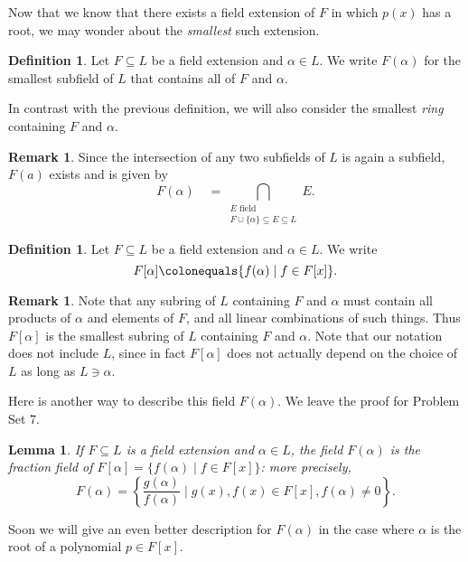 \documentclass[12pt]{report}
\newtheorem{lemma}[theorem]{Lemma}
\numberwithin{equation}{section}
\numberwithin{theorem}{chapter}
\theoremstyle{definition}
\newtheorem{definition}[theorem]{Definition}
\newtheorem*{basic properties}{Basic Properties}
\newtheorem*{Important Remark}{Important Remark}
\newtheorem{remark}[theorem]{Remark}
\begin{document}
Now that we know that there exists a field extension of $F$ in which $p(x)$ has a root, we may wonder about the {\em smallest} such extension.

\begin{definition}
Let $F \subseteq L$ be a field extension and $\alpha \in L$. We write $F(\alpha)$ for the smallest subfield of $L$ that contains all of $F$ and $\alpha$.
\end{definition}

In contrast with the previous definition, we will also consider the smallest \emph{ring} containing $F$ and $\alpha$.


\begin{remark}
Since the intersection of any two subfields of $L$ is again a subfield, $F(a)$ exists and is given by
$$F(\alpha) \quad = \bigcap_{\substack{E \text{ field } \\ F \cup \{ \alpha \}  \subseteq E   \subseteq  L}} E.$$
\end{remark}



\begin{definition}
	Let $F \subseteq L$ be a field extension and $\alpha \in L$. We write
	$$F[\alpha] \colonequals \{f(\alpha) \mid f\in F[x]\}.$$
\end{definition}

\begin{remark}
Note that any subring of $L$ containing $F$ and $\alpha$ must contain all products of $\alpha$ and elements of $F$, and all linear combinations of such things. Thus $F[\alpha]$ is the smallest subring of $L$ containing $F$ and $\alpha$. Note that our notation does not include $L$, since in fact $F[\alpha]$ does not actually depend on the choice of $L$ as long as $L \ni \alpha$.
\end{remark}



Here is another way to describe this field $F(\alpha)$. We leave the proof for Problem Set 7.

\begin{lemma}\label{lemma description F(a)}
 If $F \subseteq L$ is a field extension and $\alpha \in L$, the field $F(\alpha)$ is the fraction field of $F[\alpha]=\{f(\alpha)\mid f\in F[x]\}$: more precisely,
$$F(\alpha) = \left\{ \frac{g(\alpha)}{f(\alpha)} \mid g(x), f(x) \in F[x], f(\alpha) \neq 0 \right\}.$$
\end{lemma}

Soon we will give an even better description for $F(\alpha)$ in the case where $\alpha$ is the root of a polynomial $p \in F[x]$.
\end{document}
